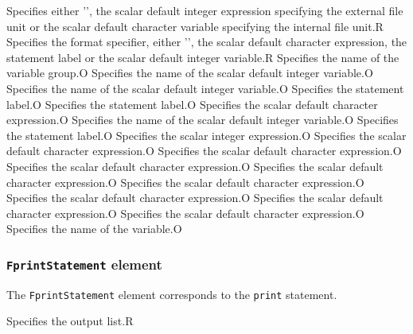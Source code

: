 \begin{XcodeMLControlList}
{Specifies either '{\tt *}', the scalar default integer expression specifying the external file unit or the scalar default character variable specifying the internal file unit.}{R}
{Specifies the format specifier, either '{\tt *}', the scalar default character expression, the statement label or the scalar default integer variable.}{R}
{Specifies the name of the variable group.}{O}
{Specifies the name of the scalar default integer variable.}{O}
{Specifies the name of the scalar default integer variable.}{O}
{Specifies the statement label.}{O}
{Specifies the statement label.}{O}
{Specifies the scalar default character expression.}{O}
{Specifies the name of the scalar default integer variable.}{O}
{Specifies the statement label.}{O}
{Specifies the scalar integer expression.}{O}
{Specifies the scalar default character expression.}{O}
{Specifies the scalar default character expression.}{O}
{Specifies the scalar default character expression.}{O}
{Specifies the scalar default character expression.}{O}
{Specifies the scalar default character expression.}{O}
{Specifies the scalar default character expression.}{O}
{Specifies the scalar default character expression.}{O}
{Specifies the scalar default character expression.}{O}
{Specifies the name of the variable.}{O}
\end{XcodeMLControlList}


\subsubsection{ {\tt FprintStatement} element}

The {\tt FprintStatement} element corresponds to the {\tt print} statement.


\begin{XcodeMLChildElements}
{Specifies the output list.}{R}
\end{XcodeMLChildElements}


